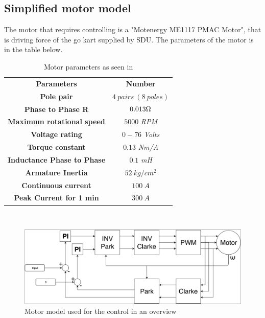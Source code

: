 \subsection{Simplified motor model}
The motor that requires controlling is a "Motenergy ME1117 PMAC Motor", that is driving force of the go kart supplied by SDU. The parameters of the motor is in the table below.

\begin{table} [H]
\centering
\begin{tabular}{|c|c|} \cline{1-2}
\textbf{Parameters} & \textbf{Number} \\ \cline{1-2}
\textbf{Pole pair} & $4\ pairs\ (8\ poles)$ \\ \cline{1-2}
\textbf{Phase to Phase R} & $0.013\ohm$ \\ \cline{1-2}
\textbf{Maximum rotational speed} & $5000$ \textit{RPM} \\ \cline{1-2}
\textbf{Voltage rating} & $0-76$ \textit{Volts} \\ \cline{1-2}
\textbf{Torque constant} & $0.13$ \textit{Nm/A} \\ \cline{1-2}
\textbf{Inductance Phase to Phase} & $0.1$ \textit{mH} \\ \cline{1-2}
\textbf{Armature Inertia} & $52\ kg/cm^2$ \\ \cline{1-2}
\textbf{Continuous current} & $100\ A$ \\ \cline{1-2}
\textbf{Peak Current for 1 min} & $300\ A$ \\ \cline{1-2}  
\end{tabular} \\
\caption{Motor parameters as seen in \cite{Motor_Parameters}}
\label{Motor_parameters_list}
\end{table}

\begin{figure}
    \centering
    \includegraphics[scale=0.25]{pictures/control/udklip.PNG}
    \caption{Motor model used for the control in an overview}
    \label{fig:my_label}
\end{figure}{}